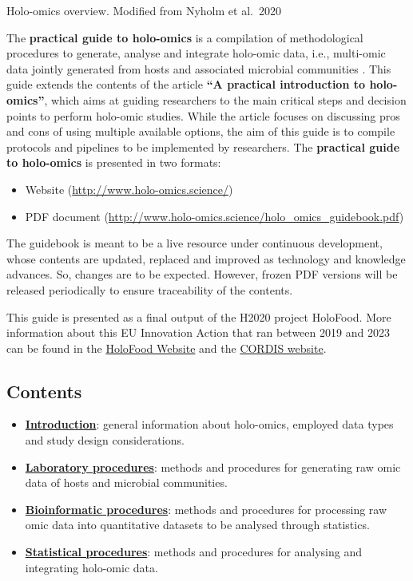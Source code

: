 \documentclass[
]{book}
\providecommand{\tightlist}{%
  \setlength{\itemsep}{0pt}\setlength{\parskip}{0pt}}
\begin{document}
\scriptsize

Holo-omics overview. Modified from Nyholm et al.~2020 \citep{Nyholm2020-ua}

\normalsize

The \textbf{practical guide to holo-omics} is a compilation of methodological procedures to generate, analyse and integrate holo-omic data, i.e., multi-omic data jointly generated from hosts and associated microbial communities \citep{Nyholm2020-ua, Limborg2018-tf}. This guide extends the contents of the article \textbf{``A practical introduction to holo-omics''}, which aims at guiding researchers to the main critical steps and decision points to perform holo-omic studies. While the article focuses on discussing pros and cons of using multiple available options, the aim of this guide is to compile protocols and pipelines to be implemented by researchers. The \textbf{practical guide to holo-omics} is presented in two formats:

\begin{itemize}
\tightlist
\item
  Website (\url{http://www.holo-omics.science/})
\item
  PDF document (\url{http://www.holo-omics.science/holo_omics_guidebook.pdf})
\end{itemize}

The guidebook is meant to be a live resource under continuous development, whose contents are updated, replaced and improved as technology and knowledge advances. So, changes are to be expected. However, frozen PDF versions will be released periodically to ensure traceability of the contents.

This guide is presented as a final output of the H2020 project HoloFood. More information about this EU Innovation Action that ran between 2019 and 2023 can be found in the \href{http://www.holofood.eu}{HoloFood Website} and the \href{https://cordis.europa.eu/project/id/817729}{CORDIS website}.

\hypertarget{contents}{%
\subsection*{Contents}\label{contents}}

\begin{itemize}
\tightlist
\item
  \textbf{\protect\hyperlink{holo-omics}{Introduction}}: general information about holo-omics, employed data types and study design considerations.
\item
  \textbf{\protect\hyperlink{about-labwork}{Laboratory procedures}}: methods and procedures for generating raw omic data of hosts and microbial communities.
\item
  \textbf{\protect\hyperlink{about-bioinformatics}{Bioinformatic procedures}}: methods and procedures for processing raw omic data into quantitative datasets to be analysed through statistics.
\item
  \textbf{\protect\hyperlink{about-statistics}{Statistical procedures}}: methods and procedures for analysing and integrating holo-omic data.
\end{itemize}
\end{document}
